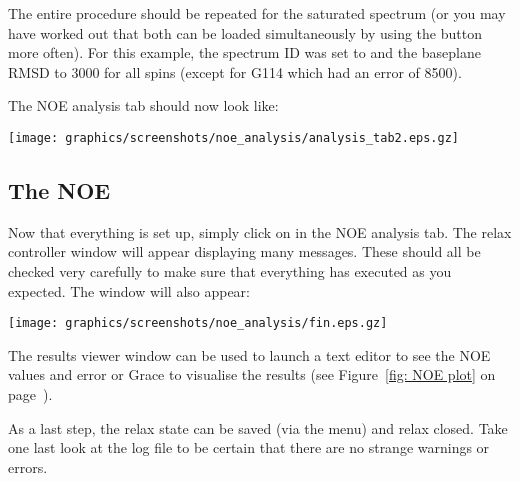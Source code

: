 The entire procedure should be repeated for the saturated spectrum (or you may have worked out that both can be loaded simultaneously by using the  button more often).  For this example, the spectrum ID was set to  and the baseplane RMSD to 3000 for all spins (except for G114 which had an error of 8500).

The NOE analysis tab should now look like:

\begin{minipage}[h]{\linewidth}
\centerline{\texttt{[image: graphics/screenshots/noe\_analysis/analysis\_tab2.eps.gz]}}
\end{minipage}



\subsection{The NOE}

Now that everything is set up, simply click on  in the NOE analysis tab.  The relax controller window will appear displaying many messages.  These should all be checked very carefully to make sure that everything has executed as you expected.  The  window will also appear:

\begin{minipage}[h]{\linewidth}
\centerline{\texttt{[image: graphics/screenshots/noe\_analysis/fin.eps.gz]}}
\end{minipage}

The results viewer window can be used to launch a text editor to see the NOE values and error or Grace to visualise the results (see Figure~\ref{fig: NOE plot} on page~\pageref{fig: NOE plot}).

As a last step, the relax state can be saved (via the  menu) and relax closed.  Take one last look at the  log file to be certain that there are no strange warnings or errors.
